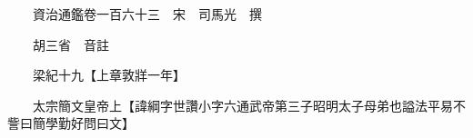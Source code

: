 










 


 
 


 

  
  
  
  
  





  
  
  
  
  
 
  

  

  
  
  



  

 
 

  
   




  

  
  


  　　資治通鑑卷一百六十三　宋　司馬光　撰

　　胡三省　音註

　　梁紀十九【上章敦牂一年】

　　太宗簡文皇帝上【諱綱字世讚小字六通武帝第三子昭明太子母弟也謚法平易不訾曰簡學勤好問曰文】

